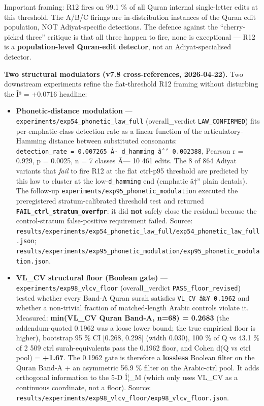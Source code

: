 \documentclass[
]{article}
\newcounter{none} %
\begin{document}
Important framing: R12 fires on 99.1 \% of all Quran internal
single-letter edits at this threshold. The A/B/C firings are
in-distribution instances of the Quran edit population, NOT
Adiyat-specific detections. The defence against the ``cherry-picked
three'' critique is that all three happen to fire, none is exceptional
--- R12 is a \textbf{population-level Quran-edit detector}, not an
Adiyat-specialised detector.

\textbf{Two structural modulators (v7.8 cross-references, 2026-04-22).}
Two downstream experiments refine the flat-threshold R12 framing without
disturbing the Î³ = +0.0716 headline:

\begin{itemize}
\item
  \textbf{Phonetic-distance modulation} ---
  \texttt{experiments/exp54\_phonetic\_law\_full} (overall\_verdict
  \texttt{LAW\_CONFIRMED}) fits per-emphatic-class detection rate as a
  linear function of the articulatory-Hamming distance between
  substituted consonants:
  \texttt{detection\_rate\ =\ 0.007265\ Â·\ d\_hamming\ âˆ’\ 0.002388},
  Pearson r = 0.929, p = 0.0025, n = 7 classes Ã--- 10 461 edits. The 8
  of 864 Adiyat variants that \emph{fail} to fire R12 at the flat
  ctrl-p95 threshold are predicted by this law to cluster at the
  low-\texttt{d\_hamming} end (emphatic â†'' plain dentals). The
  follow-up \texttt{experiments/exp95\_phonetic\_modulation} executed
  the preregistered stratum-calibrated threshold test and returned
  \textbf{\texttt{FAIL\_ctrl\_stratum\_overfpr}}: it did \textbf{not}
  safely close the residual because the control-stratum false-positive
  requirement failed. Source:
  \texttt{results/experiments/exp54\_phonetic\_law\_full/exp54\_phonetic\_law\_full.json};
  \texttt{results/experiments/exp95\_phonetic\_modulation/exp95\_phonetic\_modulation.json}.
\item
  \textbf{VL\_CV structural floor (Boolean gate)} ---
  \texttt{experiments/exp98\_vlcv\_floor} (overall\_verdict
  \texttt{PASS\_floor\_revised}) tested whether every Band-A Quran surah
  satisfies \texttt{VL\_CV\ â‰¥\ 0.1962} and whether a non-trivial
  fraction of matched-length Arabic controls violate it. Measured:
  \textbf{min(VL\_CV \textbar{} Quran Band-A, n=68) = 0.2683} (the
  addendum-quoted 0.1962 was a loose lower bound; the true empirical
  floor is higher), bootstrap 95 \% CI {[}0.268, 0.298{]} (width 0.030),
  100 \% of Q vs 43.1 \% of 2 509 ctrl surah-equivalents pass the 0.1962
  floor, and Cohen d(Q vs ctrl pool) = \textbf{+1.67}. The 0.1962 gate
  is therefore a \textbf{lossless} Boolean filter on the Quran Band-A +
  an asymmetric 56.9 \% filter on the Arabic-ctrl pool. It adds
  orthogonal information to the 5-D Î¦\_M (which only uses VL\_CV as a
  continuous coordinate, not a floor). Source:
  \texttt{results/experiments/exp98\_vlcv\_floor/exp98\_vlcv\_floor.json}.
\end{itemize}
\end{document}
